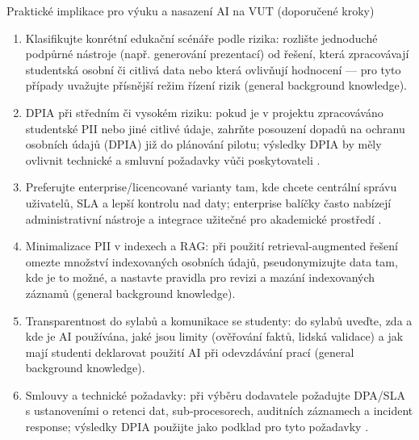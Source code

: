 \documentclass{report}%
\begin{document}
Praktické implikace pro výuku a nasazení AI na VUT (doporučené kroky)
\begin{enumerate}
  \item Klasifikujte konrétní edukační scénáře podle rizika: rozlište jednoduché podpůrné nástroje (např. generování prezen­tací) od řešení, která zpracovávají studentská osobní či citlivá data nebo která ovlivňují hodnocení — pro tyto případy uvažujte přísnější režim řízení rizik (general background knowledge).
  \item DPIA při středním či vysokém riziku: pokud je v projektu zpracováváno studentské PII nebo jiné citlivé údaje, zahrňte posouzení dopadů na ochranu osobních údajů (DPIA) již do plánování pilotu; výsledky DPIA by měly ovlivnit technické a smluvní požadavky vůči poskytovateli \cite{kb_malinka_chatgpt_ve_vyuce_dva_roky_pote_2024_pdf_90bc3aaf_page_12_1}.
  \item Preferujte enterprise/licencované varianty tam, kde chcete centrální správu uživatelů, SLA a lepší kontrolu nad daty; enterprise balíčky často nabízejí administrativní nástroje a integrace užitečné pro akademické prostředí \cite{kb_ai_101_tipu_pdf_04e4a115_page_15_2}.
  \item Minimalizace PII v indexech a RAG: při použití retrieval‑augmented řešení omezte množství indexovaných osobních údajů, pseudonymizujte data tam, kde je to možné, a nastavte pravidla pro revizi a mazání indexovaných záznamů (general background knowledge).
  \item Transparentnost do sylabů a komunikace se studenty: do sylabů uveďte, zda a kde je AI používána, jaké jsou limity (ověřování faktů, lidská validace) a jak mají studenti deklarovat použití AI při odevzdávání prací (general background knowledge).
  \item Smlouvy a technické požadavky: při výběru dodavatele požadujte DPA/SLA s ustanoveními o retenci dat, sub‑procesorech, auditních záznamech a incident response; výsledky DPIA použijte jako podklad pro tyto požadavky \cite{kb_malinka_chatgpt_ve_vyuce_dva_roky_pote_2024_pdf_90bc3aaf_page_12_1}.
\end{enumerate}
\end{document}
